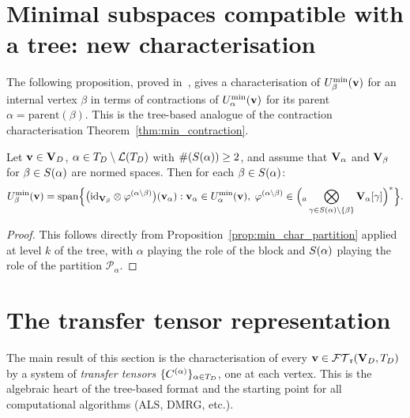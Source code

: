 \section{Minimal subspaces compatible with a tree: new characterisation}
\label{sec:algTBT:mincompat}

The following proposition, proved in~\cite{FHN2021}, gives a
characterisation of $U^{\min}_{\beta}(\mathbf{v})$ for an internal vertex $\beta$
in terms of contractions of $U^{\min}_{\alpha}(\mathbf{v})$ for its parent
$\alpha = \mathrm{parent}(\beta)$. This is the tree-based analogue of
the contraction characterisation Theorem~\ref{thm:min_contraction}.

\begin{proposition}
\label{prop:min_char_tree}
Let $\mathbf{v} \in \mathbf{V}_D$, $\alpha \in T_D \setminus \mathcal{L}(T_D)$ with
$\#(S(\alpha)) \geq 2$, and assume that $\mathbf{V}_\alpha$ and
$\mathbf{V}_\beta$ for $\beta \in S(\alpha)$ are normed spaces. Then
for each $\beta \in S(\alpha)$:
\begin{equation}
\label{eq:min_char_tree}
    U^{\min}_{\beta}(\mathbf{v})
    = \mathrm{span}\Bigl\{
        \bigl(\mathrm{id}_{\mathbf{V}_\beta} \otimes \varphi^{(\alpha \setminus \beta)}\bigr)
        (\mathbf{v}_\alpha) :
        \mathbf{v}_\alpha \in U^{\min}_{\alpha}(\mathbf{v}),\;
        \varphi^{(\alpha \setminus \beta)} \in
        \Bigl({}_a\bigotimes_{\gamma \in S(\alpha) \setminus \{\beta\}}
        \mathbf{V}_\alpha[\gamma]\Bigr)^*
    \Bigr\}.
\end{equation}
\end{proposition}

\begin{proof}
This follows directly from Proposition~\ref{prop:min_char_partition}
applied at level $k$ of the tree, with $\alpha$ playing the role of the
block and $S(\alpha)$ playing the role of the partition
$\mathcal{P}_\alpha$.
\end{proof}

\section{The transfer tensor representation}
\label{sec:algTBT:transfer}

The main result of this section is the characterisation of every
$\mathbf{v} \in \mathcal{FT}_{\mathfrak{r}}(\mathbf{V}_D,T_D)$ by a system of \emph{transfer tensors}
$\{C^{(\alpha)}\}_{\alpha \in T_D}$, one at each vertex. This is the
algebraic heart of the tree-based format and the starting point for
all computational algorithms (ALS, DMRG, etc.).

